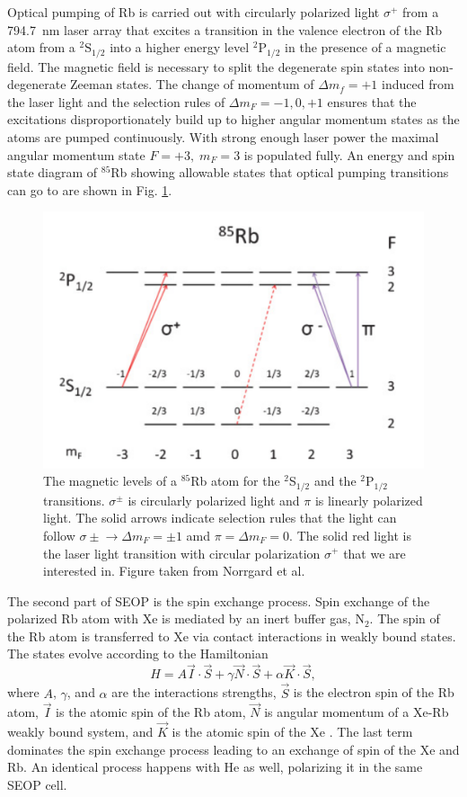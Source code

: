 Optical pumping of Rb is carried out with circularly polarized light $\sigma^+$ from a 794.7~nm laser array that excites a transition in the valence electron of the Rb atom from a $^2\textrm{S}_{1/2}$ into a higher energy level $^2\textrm{P}_{1/2}$ in the presence of a magnetic field. The magnetic field is necessary to split the degenerate spin states into non-degenerate Zeeman states. The change of momentum of $\Delta m_f=+1$ induced from the laser light and the selection rules of $\Delta m_F = -1,0,+1$ ensures that the excitations disproportionately build up to higher angular momentum states as the atoms are pumped continuously. With strong enough laser power the maximal angular momentum state $F=+3, \; m_F =3$ is populated fully. An energy and spin state diagram of $^{85}$Rb showing allowable states that optical pumping transitions can go to are shown in Fig. \ref{fig:Rb-levels}.

\begin{figure}[h!]
    \center
    \includegraphics[width=.55\textwidth]{85Rb-levels.png}
    \caption{The magnetic levels of a $^{85}$Rb atom for the $^2$S$_{1/2}$ and the $^2$P$_{1/2}$ transitions. $\sigma^\pm$ is circularly polarized light and $\pi$ is linearly polarized light. The solid arrows indicate selection rules that the light can follow $\sigma\pm \xrightarrow{} \Delta m_F = \pm 1$ amd $\pi = \Delta m_F = 0$.  The solid red light is the laser light transition with circular polarization $\sigma^+$ that we are interested in. Figure taken from Norrgard et al.  \cite{Norrgard2010}}
    \label{fig:Rb-levels}
\end{figure}

The second part of SEOP is the spin exchange process. Spin exchange of the polarized Rb atom with Xe is mediated by an inert buffer gas, N$_2$. The spin of the Rb atom is transferred to Xe via contact interactions in weakly bound states. The states evolve according to the Hamiltonian 
\begin{equation}
    H = A \vec{I}\cdot \vec{S}+\gamma \vec{N}\cdot \vec{S}+\alpha \vec{K}\cdot \vec{S},
\end{equation}
where $A$, $\gamma$, and $\alpha$ are the interactions strengths, $\vec{S}$ is the electron spin of the Rb atom, $\vec{I}$ is the atomic spin of the Rb atom, $\vec{N}$ is angular momentum of a Xe-Rb weakly bound system, and $\vec{K}$ is the atomic spin of the Xe \cite{Happer1984}. The last term dominates the spin exchange process leading to an exchange of spin of the Xe and Rb. An identical process happens with He as well, polarizing it in the same SEOP cell. 

